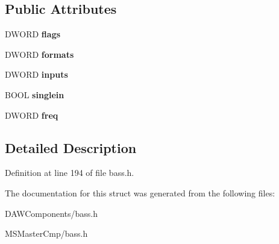 \subsection*{Public Attributes}
\begin{DoxyCompactItemize}
\item 
\hypertarget{struct_b_a_s_s___r_e_c_o_r_d_i_n_f_o_a97ae96c797ff1c981b459506629bad9c_a97ae96c797ff1c981b459506629bad9c}{D\-W\-O\-R\-D {\bfseries flags}}\label{struct_b_a_s_s___r_e_c_o_r_d_i_n_f_o_a97ae96c797ff1c981b459506629bad9c_a97ae96c797ff1c981b459506629bad9c}

\item 
\hypertarget{struct_b_a_s_s___r_e_c_o_r_d_i_n_f_o_aedfae3cd5f0d09c239eda38ed3ef9c2b_aedfae3cd5f0d09c239eda38ed3ef9c2b}{D\-W\-O\-R\-D {\bfseries formats}}\label{struct_b_a_s_s___r_e_c_o_r_d_i_n_f_o_aedfae3cd5f0d09c239eda38ed3ef9c2b_aedfae3cd5f0d09c239eda38ed3ef9c2b}

\item 
\hypertarget{struct_b_a_s_s___r_e_c_o_r_d_i_n_f_o_a7b049b2bd7f57b9f8fba6f01c0106589_a7b049b2bd7f57b9f8fba6f01c0106589}{D\-W\-O\-R\-D {\bfseries inputs}}\label{struct_b_a_s_s___r_e_c_o_r_d_i_n_f_o_a7b049b2bd7f57b9f8fba6f01c0106589_a7b049b2bd7f57b9f8fba6f01c0106589}

\item 
\hypertarget{struct_b_a_s_s___r_e_c_o_r_d_i_n_f_o_a5a18b145e6f2bf4670cc815cea5744ec_a5a18b145e6f2bf4670cc815cea5744ec}{B\-O\-O\-L {\bfseries singlein}}\label{struct_b_a_s_s___r_e_c_o_r_d_i_n_f_o_a5a18b145e6f2bf4670cc815cea5744ec_a5a18b145e6f2bf4670cc815cea5744ec}

\item 
\hypertarget{struct_b_a_s_s___r_e_c_o_r_d_i_n_f_o_af643ddd16623da7b0370ab191d8bb204_af643ddd16623da7b0370ab191d8bb204}{D\-W\-O\-R\-D {\bfseries freq}}\label{struct_b_a_s_s___r_e_c_o_r_d_i_n_f_o_af643ddd16623da7b0370ab191d8bb204_af643ddd16623da7b0370ab191d8bb204}

\end{DoxyCompactItemize}


\subsection{Detailed Description}


Definition at line 194 of file bass.\-h.



The documentation for this struct was generated from the following files\-:\begin{DoxyCompactItemize}
\item 
D\-A\-W\-Components/bass.\-h\item 
M\-S\-Master\-Cmp/bass.\-h\end{DoxyCompactItemize}
